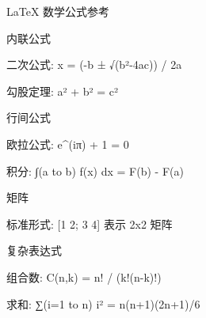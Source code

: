 \documentclass{article}
\begin{document}
LaTeX 数学公式参考

内联公式

二次公式: x = (-b ± √(b²-4ac)) / 2a

勾股定理: a² + b² = c²

行间公式

欧拉公式: e^(iπ) + 1 = 0

积分: ∫(a to b) f(x) dx = F(b) - F(a)

矩阵

标准形式: [1 2; 3 4] 表示 2x2 矩阵

复杂表达式

组合数: C(n,k) = n! / (k!(n-k)!)

求和: ∑(i=1 to n) i² = n(n+1)(2n+1)/6
\end{document}
